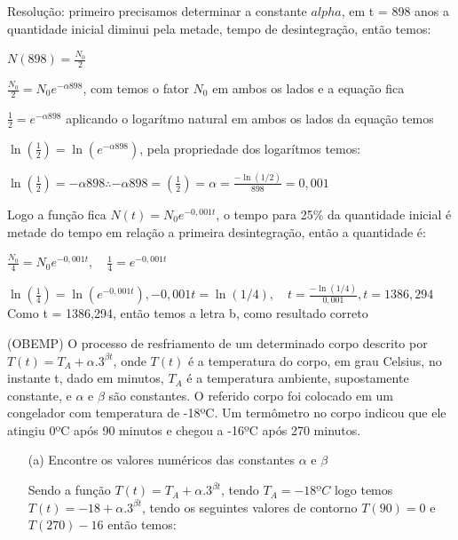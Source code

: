 \begin{multicols*}{2}
            Resolução: primeiro precisamos determinar a constante $alpha$, em t = 898 anos a quantidade 			inicial diminui pela metade, tempo de desintegração, então temos:
            
            $N(898) = \frac{N_0}{2}$
            
            $\frac{N_0}{2} = N_0 e^{- \alpha 898}$, com temos o fator $N_0$ em ambos os lados e a equação 			fica
            
            $\frac{1}{2} = e^{- \alpha 898}$ aplicando o logarítmo natural em ambos os lados da equação 			temos
            
            $\ln \left(\frac{1}{2} \right) = \ln \left( e^{- \alpha 898} \right)$, pela propriedade dos 			logarítmos temos:
            
            $\ln \left(\frac{1}{2} \right) =  - \alpha 898  \therefore 
             - \alpha 898 =  \left(\frac{1}{2} \right) = \alpha = \frac{-\ln(1/2)}{898} = 0,001$
             
             Logo a função fica $N(t) = N_0 e^{-0,001t}$, o tempo para 25\% da quantidade inicial é metade 			do tempo em relação a primeira desintegração, então a quantidade é:
              
             
             
             $\frac{N_0}{4} = N_0 e^{-0,001 t}, \quad \frac{1}{4} = e^{-0,001t}$
             
             $\ln \left( \frac{1}{4} \right) = \ln \left( e^{-0,001t} \right), 
                -0,001t = \ln( 1/4), \quad t = \frac{ - \ln( 1/4)}{ 0,001}, t = 1386,294
             $
              Como t = 1386,294, então temos a letra b, como resultado correto
             
             
            (OBEMP) O processo de resfriamento de um determinado corpo descrito por 
            $T(t) = T_A + \alpha.3^{\beta t}$, onde $T(t)$ é a temperatura do corpo, em grau Celsius, no 			instante t, dado em minutos, $T_A$ é a temperatura ambiente, supostamente constante, e $\alpha$
            e $\beta$ são constantes. O referido corpo foi colocado em um congelador com temperatura de 			-18ºC. Um termômetro no corpo indicou que ele atingiu 0ºC após 90 minutos e chegou a 					-16ºC após 270 minutos.
            \begin{itemize}
            \item[(a)] Encontre os valores numéricos das constantes $\alpha$ e $\beta$
            
            Sendo a função $T(t) = T_A + \alpha.3^{\beta t}$, tendo $T_A = -18ºC$ logo temos 
            $T(t) = -18 + \alpha.3^{\beta t}$, tendo os seguintes valores de contorno $T(90) = 0$ e 
            $T(270) -16$ então temos:
            

\end{itemize}
\end{multicols*}
